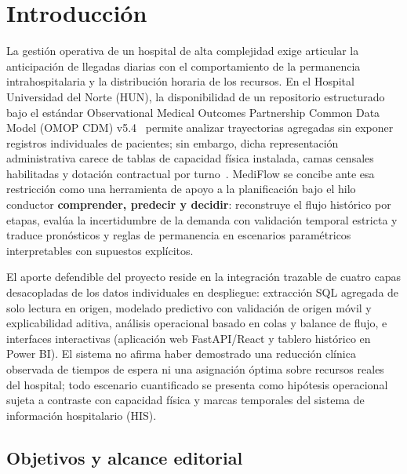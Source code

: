 
\section{Introducción}

La gestión operativa de un hospital de alta complejidad exige articular la anticipación de llegadas diarias con el comportamiento de la permanencia intrahospitalaria y la distribución horaria de los recursos. En el Hospital Universidad del Norte (HUN), la disponibilidad de un repositorio estructurado bajo el estándar Observational Medical Outcomes Partnership Common Data Model (OMOP CDM) v5.4~\cite{ohdsi54} permite analizar trayectorias agregadas sin exponer registros individuales de pacientes; sin embargo, dicha representación administrativa carece de tablas de capacidad física instalada, camas censales habilitadas y dotación contractual por turno~\cite{mediflow2026informe}. MediFlow se concibe ante esa restricción como una herramienta de apoyo a la planificación bajo el hilo conductor \textbf{comprender, predecir y decidir}: reconstruye el flujo histórico por etapas, evalúa la incertidumbre de la demanda con validación temporal estricta y traduce pronósticos y reglas de permanencia en escenarios paramétricos interpretables con supuestos explícitos.

El aporte defendible del proyecto reside en la integración trazable de cuatro capas desacopladas de los datos individuales en despliegue: extracción SQL agregada de solo lectura en origen, modelado predictivo con validación de origen móvil y explicabilidad aditiva, análisis operacional basado en colas y balance de flujo, e interfaces interactivas (aplicación web FastAPI/React y tablero histórico en Power BI). El sistema no afirma haber demostrado una reducción clínica observada de tiempos de espera ni una asignación óptima sobre recursos reales del hospital; todo escenario cuantificado se presenta como hipótesis operacional sujeta a contraste con capacidad física y marcas temporales del sistema de información hospitalario (HIS).

\subsection{Objetivos y alcance editorial}


